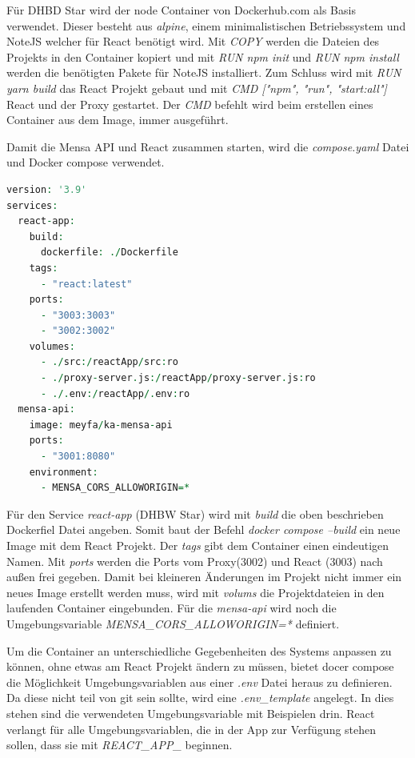 Für DHBD Star wird der node Container von Dockerhub.com als Basis verwendet. Dieser besteht aus \emph{alpine}, einem minimalistischen Betriebssystem und NoteJS welcher für React benötigt wird.
Mit \emph{COPY} werden die Dateien des Projekts in den Container kopiert und mit \emph{RUN npm init} und \emph{RUN npm install} werden die benötigten Pakete für NoteJS installiert.
Zum Schluss wird mit \emph{RUN yarn build} das React Projekt gebaut und mit \emph{CMD ["npm", "run", "start:all"]} React und der Proxy gestartet. Der \emph{CMD} befehlt wird beim erstellen eines Container aus dem Image, immer ausgeführt. 

Damit die Mensa API und React zusammen starten, wird die \emph{compose.yaml} Datei und Docker compose verwendet.

\begin{lstlisting}[language=vhdl,
	frame=single,           % Ein Rahmen um den Code
	framexleftmargin=15pt,  % Rahmen link von den Zahlen
	style=algoBericht,
	label={Dockerfile},
	captionpos=b           % Caption unter den Code setzen
	caption={compose.yaml für DHBW-Star}]
version: '3.9'
services:
  react-app:
    build:
      dockerfile: ./Dockerfile
    tags:
      - "react:latest"
    ports:
      - "3003:3003"
      - "3002:3002"
    volumes:
      - ./src:/reactApp/src:ro
      - ./proxy-server.js:/reactApp/proxy-server.js:ro
      - ./.env:/reactApp/.env:ro
  mensa-api:
    image: meyfa/ka-mensa-api
    ports:
      - "3001:8080"
    environment:
      - MENSA_CORS_ALLOWORIGIN=*
\end{lstlisting}

Für den Service \emph{react-app} (DHBW Star) wird mit \emph{build} die oben beschrieben Dockerfiel Datei angeben. Somit baut der Befehl \emph{docker compose --build} ein neue Image mit dem React Projekt.
Der \emph{tags} gibt dem Container einen eindeutigen Namen.
Mit \emph{ports} werden die Ports vom Proxy(3002) und React (3003) nach außen frei gegeben.
Damit bei kleineren Änderungen im Projekt nicht immer ein neues Image erstellt werden muss, wird mit \emph{volums} die Projektdateien in den laufenden Container eingebunden.
Für die \emph{mensa-api} wird noch die Umgebungsvariable \emph{MENSA\_CORS\_ALLOWORIGIN=*} definiert.

Um die Container an unterschiedliche Gegebenheiten des Systems anpassen zu können, ohne etwas am React Projekt ändern zu müssen, bietet docer compose die Möglichkeit Umgebungsvariablen aus einer \emph{.env} Datei heraus zu definieren.
Da diese nicht teil von git sein sollte, wird eine \emph{.env\_template} angelegt. In dies stehen sind die verwendeten Umgebungsvariable mit Beispielen drin.
React verlangt für alle Umgebungsvariablen, die in der App zur Verfügung stehen sollen, dass sie mit \emph{REACT\_APP\_} beginnen.

